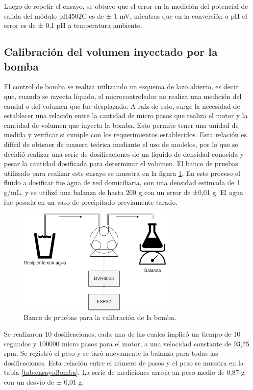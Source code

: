 Luego de repetir el ensayo, se obtuvo que el error en la medición del potencial de salida del módulo pH4502C es de ± 1 mV, mientras que en la conversión a pH el error es de ± 0,1 pH a temperatura ambiente. 

\subsection{Calibración del volumen inyectado por la bomba}

El control de bomba se realiza utilizando un esquema de lazo abierto, es decir que, cuando se inyecta líquido, el microcontrolador  no realiza una medición del caudal o del volumen que fue desplazado. A raíz de esto, surge la necesidad de establecer una relación entre la cantidad de micro pasos que realiza el motor y la cantidad de volumen que inyecta la bomba. Esto permite tener una unidad de medida y verificar si cumple con los requerimientos establecidos. Esta relación es difícil de obtener de manera teórica mediante el uso de modelos, por lo que se decidió realizar una serie de dosificaciones de un líquido de densidad conocida y pesar la cantidad dosificada para determinar el volumen.
El banco de pruebas utilizado para realizar este ensayo se muestra en la figura \ref{fig:bancoPruebasBomba}. En este proceso el fluido a dosificar fue agua de red domiciliaria, con una densidad estimada de 1 g/mL, y se utilizó una balanza de hasta 200 g con un error de ±0,01 g. El agua fue pesada en un vaso de precipitado previamente tarado.

\begin{figure}[htbp]
	\centering
	\includegraphics[width=0.7\textwidth]{./Figures/bancoPruebasBomba.png}
	\caption{Banco de pruebas para la calibración de la bomba.}
	\label{fig:bancoPruebasBomba}
\end{figure}

Se realizaron 10 dosificaciones, cada una de las cuales implicó un tiempo de 10 segundos y 100000 micro pasos para el motor, a una velocidad constante de 93,75 rpm. Se registró el peso y se taró nuevamente la balanza para todas las dosificaciones. Esta relación entre el número de pasos y el peso se muestra en la tabla \ref{tab:ensayoBomba}. La serie de mediciones arroja un peso medio de 0,87 g con un desvío de ± 0,01 g.

